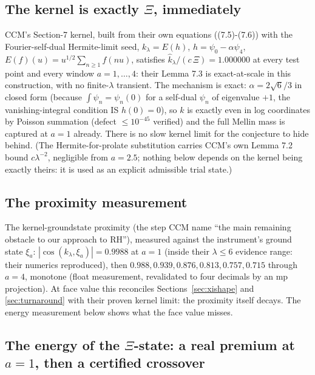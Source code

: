 \documentclass[10pt]{article}
\begin{document}
\subsection{The kernel is exactly $\Xi$, immediately}\label{sec:kernel}

CCM's Section-7 kernel, built from their own equations ((7.5)-(7.6)) with the Fourier-self-dual Hermite-limit seed, $k_\lambda = E(h)$, $h = \psi_0 - \alpha\psi_4$, $E(f)(u) = u^{1/2}\sum_{n \ge 1} f(nu)$, satisfies $\hat k_\lambda/(c\,\Xi) = 1.000000$ at every test point and every window $a = 1, \ldots, 4$: their Lemma 7.3 is exact-at-scale in this construction, with no finite-$\lambda$ transient. The mechanism is exact: $\alpha = 2\sqrt6/3$ in closed form (because $\int \psi_n = \psi_n(0)$ for a self-dual $\psi_n$ of eigenvalue $+1$, the vanishing-integral condition IS $h(0) = 0$), so $k$ is exactly even in log coordinates by Poisson summation (defect $\le 10^{-45}$ verified) and the full Mellin mass is captured at $a = 1$ already. There is no slow kernel limit for the conjecture to hide behind. (The Hermite-for-prolate substitution carries CCM's own Lemma 7.2 bound $c\lambda^{-2}$, negligible from $a = 2.5$; nothing below depends on the kernel being exactly theirs: it is used as an explicit admissible trial state.)

\subsection{The proximity measurement}\label{sec:proximity}

The kernel-groundstate proximity (the step CCM name ``the main remaining obstacle to our approach to RH''), measured against the instrument's ground state $\xi_a$: $|\cos(k_\lambda, \xi_a)| = 0.9988$ at $a = 1$ (inside their $\lambda \le 6$ evidence range: their numerics reproduced), then $0.988, 0.939, 0.876, 0.813, 0.757, 0.715$ through $a = 4$, monotone (float measurement, revalidated to four decimals by an mp projection). At face value this reconciles Sections~\ref{sec:xishape} and \ref{sec:turnaround} with their proven kernel limit: the proximity itself decays. The energy measurement below shows what the face value misses.

\subsection{The energy of the $\Xi$-state: a real premium at $a = 1$, then a certified crossover}\label{sec:energy}
\end{document}
